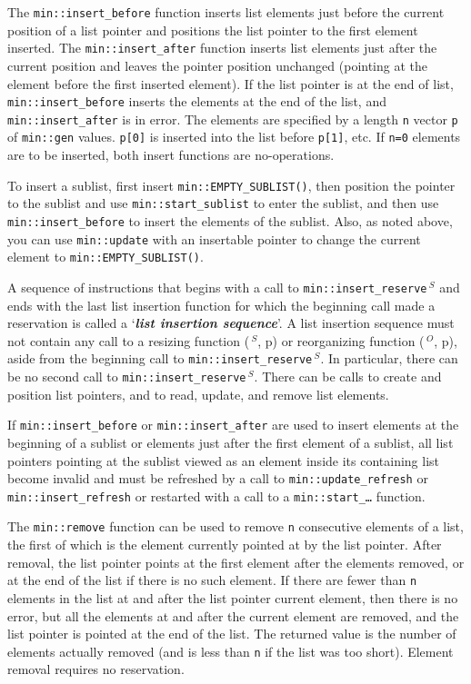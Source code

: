 \documentclass[12pt]{article}
\newcommand{\key}[1]{{\bf \em #1}\index{#1}}
\newcommand{\pagref}[1]{p\pageref{#1}}
\newcommand{\EOL}{\penalty \exhyphenpenalty}
\newcommand{\RESIZE}{$\,^S$}
\newcommand{\REORG}{$\,^O$}
\begin{document}
The {\tt min::\EOL insert\_before} function inserts list elements
just before the current position of a list pointer and positions the
list pointer to the first element inserted.
The {\tt min::\EOL insert\_after} function inserts list elements just after the
current position and leaves the pointer position unchanged (pointing at
the element before the first inserted element).
If the list pointer is at the end of list,
{\tt min::\EOL insert\_before} inserts the elements at the end of the list, and
{\tt min::\EOL insert\_after} is in error.
The elements are specified by a length {\tt n}
vector {\tt p} of {\tt min::gen} values.
\verb|p[0]| is inserted into the list before \verb|p[1]|, etc.
If \verb|n=0| elements are to be inserted, both insert
functions are no-operations.

To insert a sublist, first insert {\tt min::\EOL EMPTY\_SUBLIST()}, then
position the pointer to the sublist and use
{\tt min::\EOL start\_sublist} to enter the sublist, and then use
{\tt min::\EOL insert\_before} to insert the elements of the sublist.
Also, as noted above, you can use {\tt min::\EOL update} with an
insertable pointer to change
the current element to {\tt min::\EOL EMPTY\_\EOL SUBLIST()}.

A sequence of instructions that begins with a
call to {\tt min::\EOL insert\_reserve\RESIZE} and ends with the last
list insertion function for which the beginning call made a reservation
is called a `\key{list insertion sequence}'.  A list insertion sequence
must not contain any call to a resizing function
(\RESIZE, \pagref{RESIZING-FUNCTIONS}) or reorganizing function
(\REORG, \pagref{REORGANIZING-FUNCTIONS}), aside from
the beginning call to {\tt min::\EOL insert\_reserve\RESIZE}.
In particular, there can be no
second call to {\tt min::\EOL insert\_reserve\RESIZE}.  There can be calls to
create and position list pointers, and to read, update, and remove
list elements.

If {\tt min::\EOL insert\_\EOL before}
or {\tt min::\EOL insert\_\EOL after}
are used to insert elements at the beginning of a sublist or elements
just after the first element of a sublist,
all list pointers pointing at the sublist viewed as an element
inside its containing list
become invalid and must be refreshed by
a call to {\tt min::\EOL update\_\EOL refresh} or
{\tt min::\EOL insert\_\EOL refresh} or restarted with a call to a
{\tt min::\EOL start\_\ldots} function.

The {\tt min::\EOL remove} function can be used to remove
{\tt n} consecutive elements
of a list, the first of which is the element currently pointed at by
the list pointer.
After removal, the list pointer points at the first element after the
elements removed, or at the end of the list if there is no such element.
If there are fewer than {\tt n} elements in the list at and after
the list pointer current element, then there is no error, but all the
elements at and after the current element are removed, and the list
pointer is pointed at the end of the list.  The returned value is the
number of elements actually removed (and is less than {\tt n} if the
list was too short).  Element removal requires no reservation.
\end{document}
